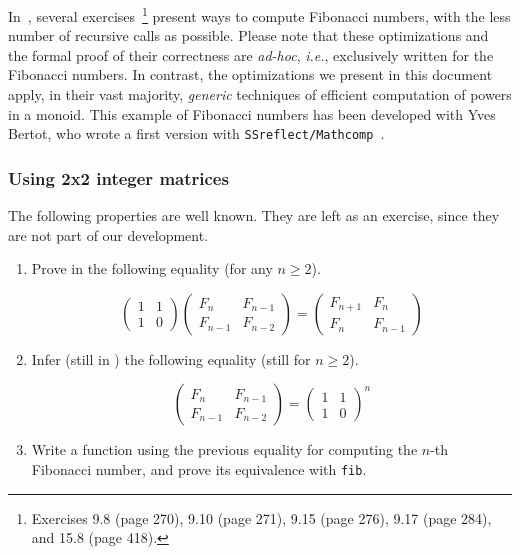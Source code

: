 In~\cite{BC04}, several exercises~\footnote{Exercises 9.8 (page 270), 9.10 (page 271), 9.15 (page 276), 9.17 (page 284), and 15.8 (page 418).}
present ways to compute Fibonacci numbers, with the less number of recursive calls  as possible. Please note that these optimizations and the formal proof of their correctness are \emph{ad-hoc}, \emph{i.e.}, exclusively written for the
Fibonacci numbers.
In contrast, the optimizations we present in this document apply, in their vast majority, \emph{generic} techniques of efficient computation of powers in a monoid. 
This example of Fibonacci numbers has been developed with Yves Bertot, who wrote a first version with \texttt{SSreflect/Mathcomp}~\cite{MCB}.


\subsubsection{Using 2x2 integer matrices}

The following properties are well known. They are left as an exercise, since they are not part of our development. 


\begin{exercise}
  \label{exercise:fibmat}
  \begin{enumerate}
  \item 

Prove in \coq{} the following equality (for any $n\geq 2$). \label{fibmat-eq1}

\[
\left(
  \begin{array}{cc}
    1 & 1 \\
    1 & 0 
  \end{array}
\right)
\left(
  \begin{array}{cc}
    F_{n}& F_{n-1} \\
    F_{n-1} & F_{n-2}
  \end{array}
\right)
=
\left(
  \begin{array}{cc}
    F_{n+1}& F_{n} \\
    F_{n} & F_{n-1} 
  \end{array}
\right)
\]
  
\item Infer (still in \coq{}) the following equality (still for $n\geq 2$).



\[
\left(
  \begin{array}{cc}
    F_{n}& F_{n-1} \\
    F_{n-1} & F_{n-2} 
  \end{array}
\right)
= 
\left(
  \begin{array}{cc}
    1 & 1 \\
    1 & 0 
  \end{array}
\right)^n
\]

\item Write a function using the previous equality for computing the $n$-th Fibonacci number, and prove its equivalence with \texttt{fib}.

\end{enumerate}
\end{exercise}

